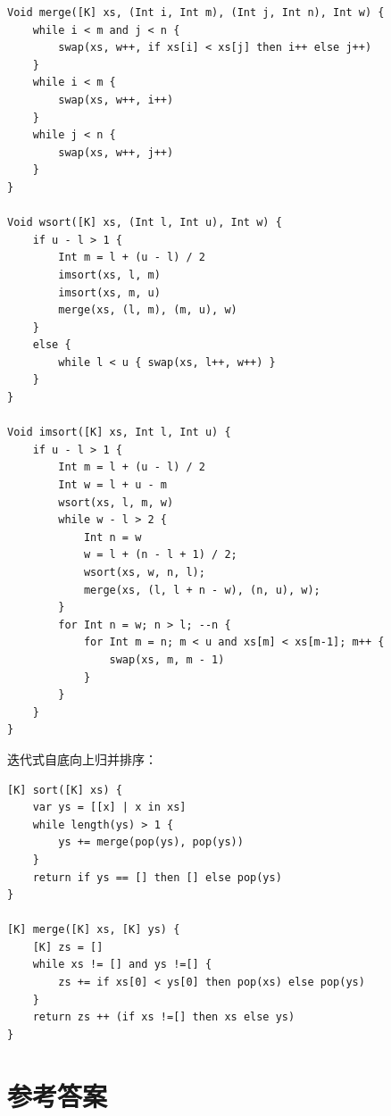 \documentclass[b5paper]{ctexart}
\begin{document}
\begin{lstlisting}[language = Bourbaki]
Void merge([K] xs, (Int i, Int m), (Int j, Int n), Int w) {
    while i < m and j < n {
        swap(xs, w++, if xs[i] < xs[j] then i++ else j++)
    }
    while i < m {
        swap(xs, w++, i++)
    }
    while j < n {
        swap(xs, w++, j++)
    }
}

Void wsort([K] xs, (Int l, Int u), Int w) {
    if u - l > 1 {
        Int m = l + (u - l) / 2
        imsort(xs, l, m)
        imsort(xs, m, u)
        merge(xs, (l, m), (m, u), w)
    }
    else {
        while l < u { swap(xs, l++, w++) }
    }
}

Void imsort([K] xs, Int l, Int u) {
    if u - l > 1 {
        Int m = l + (u - l) / 2
        Int w = l + u - m
        wsort(xs, l, m, w)
        while w - l > 2 {
            Int n = w
            w = l + (n - l + 1) / 2;
            wsort(xs, w, n, l);
            merge(xs, (l, l + n - w), (n, u), w);
        }
        for Int n = w; n > l; --n {
            for Int m = n; m < u and xs[m] < xs[m-1]; m++ {
                swap(xs, m, m - 1)
            }
        }
    }
}
\end{lstlisting}

迭代式自底向上归并排序：

\begin{lstlisting}[language = Bourbaki]
[K] sort([K] xs) {
    var ys = [[x] | x in xs]
    while length(ys) > 1 {
        ys += merge(pop(ys), pop(ys))
    }
    return if ys == [] then [] else pop(ys)
}

[K] merge([K] xs, [K] ys) {
    [K] zs = []
    while xs != [] and ys !=[] {
        zs += if xs[0] < ys[0] then pop(xs) else pop(ys)
    }
    return zs ++ (if xs !=[] then xs else ys)
}
\end{lstlisting}

\section{参考答案}
\shipoutAnswer
\end{document}
